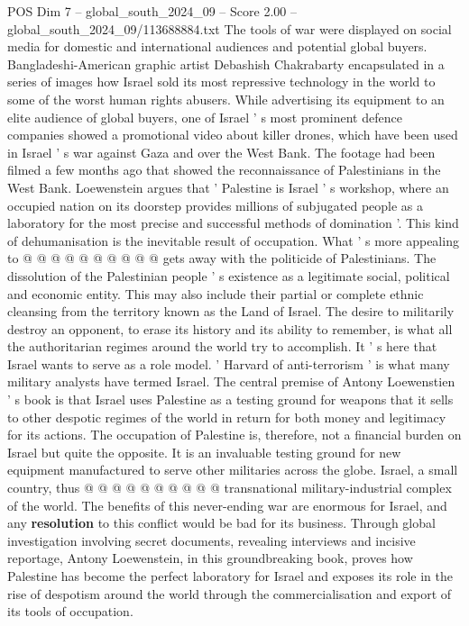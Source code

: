\begin{textsample}{POS Dim 7 – global\_south\_2024\_09 – Score 2.00 – global\_south\_2024\_09/113688884.txt}
The tools of war were displayed on social media for domestic and international audiences and potential global buyers.
Bangladeshi-American graphic artist Debashish Chakrabarty encapsulated in a series of images how Israel sold its most repressive technology in the world to some of the worst human rights abusers.
While advertising its equipment to an elite audience of global buyers, one of Israel ' s most prominent defence companies showed a promotional video about killer drones, which have been used in Israel ' s war against Gaza and over the West Bank.
The footage had been filmed a few months ago that showed the reconnaissance of Palestinians in the West Bank.
Loewenstein argues that ' Palestine is Israel ' s workshop, where an occupied nation on its doorstep provides millions of subjugated people as a laboratory for the most precise and successful methods of domination '.
This kind of dehumanisation is the inevitable result of occupation.
What ' s more appealing to @ @ @ @ @ @ @ @ @ @ gets away with the politicide of Palestinians.
The dissolution of the Palestinian people ' s existence as a legitimate social, political and economic entity.
This may also include their partial or complete ethnic cleansing from the territory known as the Land of Israel.
The desire to militarily destroy an opponent, to erase its history and its ability to remember, is what all the authoritarian regimes around the world try to accomplish.
It ' s here that Israel wants to serve as a role model. ' Harvard of anti-terrorism ' is what many military analysts have termed Israel.
The central premise of Antony Loewenstien ' s book is that Israel uses Palestine as a testing ground for weapons that it sells to other despotic regimes of the world in return for both money and legitimacy for its actions.
The occupation of Palestine is, therefore, not a financial burden on Israel but quite the opposite.
It is an invaluable testing ground for new equipment manufactured to serve other militaries across the globe.
Israel, a small country, thus @ @ @ @ @ @ @ @ @ @ transnational military-industrial complex of the world.
The benefits of this never-ending war are enormous for Israel, and any \textbf{resolution} to this conflict would be bad for its business.
Through global investigation involving secret documents, revealing interviews and incisive reportage, Antony Loewenstein, in this groundbreaking book, proves how Palestine has become the perfect laboratory for Israel and exposes its role in the rise of despotism around the world through the commercialisation and export of its tools of occupation.

\end{textsample}
